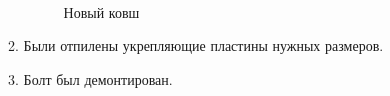 \begin{enumerate}
\begin{enumerate}
\begin{figure}[H]
\begin{minipage}[h]{0.29\linewidth}
			\end{minipage}
			\hfill
			\begin{minipage}[h]{0.2\linewidth}
				\center  
			\end{minipage}
			\caption{Новый ковш}
		\end{figure}
		
		\item Были отпилены укрепляющие пластины нужных размеров.
		
		\item Болт был демонтирован.
		
	\end{enumerate}
	

\end{enumerate}
